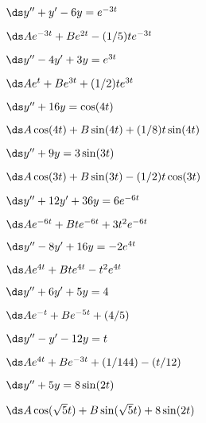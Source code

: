 \begin{enumialphparenastyle}
\begin{ex}
 $\ds y''+y'-6y=e^{-3t}$
\begin{sol}
 $\ds Ae^{-3t}+Be^{2t}-(1/5)te^{-3t}$
\end{sol}
\end{ex}


\begin{ex}
 $\ds y''-4y'+3y=e^{3t}$
\begin{sol}
 $\ds Ae^t+Be^{3t}+(1/2)te^{3t}$
\end{sol}
\end{ex}


\begin{ex}
 $\ds y''+16y=\cos(4t)$
\begin{sol}
 $\ds A\cos(4t)+B\sin(4t)+(1/8)t\sin(4t)$
\end{sol}
\end{ex}


\begin{ex}
 $\ds y'' +9y=3\sin(3t)$
\begin{sol}
 $\ds A\cos(3t)+B\sin(3t)-(1/2)t\cos(3t)$
\end{sol}
\end{ex}


\begin{ex}
 $\ds y''+12y'+36y=6e^{-6t}$
\begin{sol}
 $\ds Ae^{-6t}+Bte^{-6t}+3t^2e^{-6t}$
\end{sol}
\end{ex}


\begin{ex}
 $\ds y''-8y'+16y=-2e^{4t}$
\begin{sol}
 $\ds Ae^{4t}+Bte^{4t}-t^2e^{4t}$
\end{sol}
\end{ex}


\begin{ex}
 $\ds y''+6y'+5y=4$
\begin{sol}
 $\ds Ae^{-t}+Be^{-5t}+(4/5)$
\end{sol}
\end{ex}


\begin{ex}
 $\ds y''-y'-12y=t$
\begin{sol}
 $\ds Ae^{4t}+Be^{-3t}+(1/144)-(t/12)$
\end{sol}
\end{ex}


\begin{ex}
 $\ds y''+5y=8\sin(2t)$
\begin{sol}
 $\ds A\cos(\sqrt5t)+B\sin(\sqrt5t)+8\sin(2t)$
\end{sol}
\end{ex}



\end{enumialphparenastyle}
